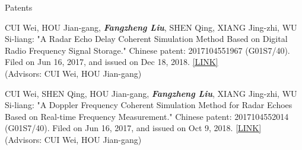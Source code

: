 \documentclass{resume} %
\begin{document}
%
\begin{rSection}{Patents}

\begin{itemlabel}
\item CUI Wei, HOU Jian-gang, \textbf{\textit{Fangzheng Liu}}, SHEN Qing, XIANG Jing-zhi, WU Si-liang: "A Radar Echo Delay Coherent Simulation Method Based on Digital Radio Frequency Signal Storage." Chinese patent: 2017104551967 (G01S7/40). Filed on Jun 16, 2017, and issued on Dec 18, 2018. \href{http://www.zlqiao.com/zlqiao/patent-f0301af6125548659bae9e05ed9543d6.html}{[LINK]}\\
(Advisors: CUI Wei, HOU Jian-gang)
\smallskip
\smallskip

\item CUI Wei, SHEN Qing, HOU Jian-gang, \textbf{\textit{Fangzheng Liu}}, XIANG Jing-zhi, WU Si-liang: "A Doppler Frequency Coherent Simulation Method for Radar Echoes Based on Real-time Frequency Measurement." Chinese patent: 2017104552014 (G01S7/40). Filed on Jun 16, 2017, and issued on Oct 9, 2018. \href{http://www.zlqiao.com/zlqiao/patent-4dc7dd85795d40a08320e507561834ca.html}{[LINK]}\\
(Advisors: CUI Wei, HOU Jian-gang)
\end{itemlabel}
\end{rSection}

%
\end{document}

